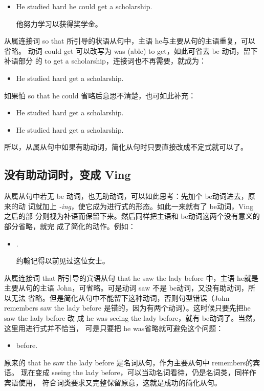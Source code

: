 \begin{itemize}
\item He studied hard  he could get a scholarship.

  他努力学习以获得奖学金。
\end{itemize}
从属连接词 so that 所引导的状语从句中，主语 he与主要从句的主语重复，可以省略。
动词 could get 可以改写为 was (able) to get，如此可省去 be 动词，留下补语部分
的 to get a scholarship，连接词也不再需要，就成为：
\begin{itemize}
\item He studied hard  get a scholarship.
\end{itemize}
如果怕 so that he could 省略后意思不清楚，也可如此补充：
\begin{itemize}
\item   He studied hard  get a scholarship.
\item   He studied hard  get a scholarship.
\end{itemize}

所以，从属从句中如果有助动词，简化从句时只要直接改成不定式就可以了。

\subsection{没有助动词时，变成 Ving}
\label{subsec:toing}

从属从句中若无 be 动词，也无助动词，可以如此思考：先加个 be动词进去，原来的动
词就加上 \emph{-ing}，使它成为进行式的形态。如此一来就有了 be动词，Ving 之后的部
分则视为补语而保留下来。然后同样把主语和 be动词这两个没有意义的部分省略，就完
成了简化的动作。例如：
\begin{itemize}
\item {}   .

  约翰记得以前见过这位女士。
\end{itemize}

从属连接词 that 所引导的宾语从句 that he saw the lady before 中，主语 he就是
主要从句的主语 John，可省略。可是动词 saw 不是 be动词，又没有助动词，所以无法
省略。但是简化从句中不能留下这种动词，否则句型错误（John remembers saw the
lady before 是错的，因为有两个动词）。这时候只要先把he saw the lady before 改
成 he was seeing the lady before，就有 be动词了。当然，这里用进行式并不恰当，
可是只要把 he was省略就可避免这个问题：
\begin{itemize}
\item {}   before.
\end{itemize}
原来的 that he saw the lady before 是名词从句，作为主要从句中 remembers的宾语。
现在变成 seeing the lady before，可以当动名词看待，仍是名词类，同样作宾语使用，
符合词类要求又完整保留原意，这就是成功的简化从句。

